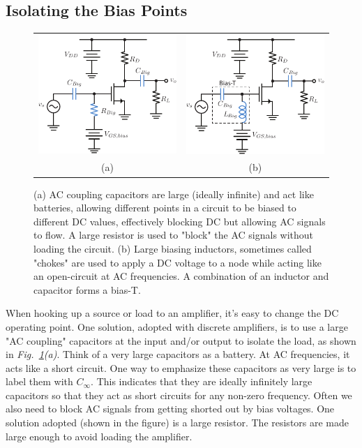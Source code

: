 \subsection{Isolating the Bias Points}
\begin{figure}[tb]
\centering
\begin{tabular}{cc}
\includegraphics[width=.4\columnwidth]{csamp_bias} &
\includegraphics[width=.4\columnwidth]{csamp_biasT}\\
(a) & (b)\\
\end{tabular}
\caption{(a) AC coupling capacitors are large (ideally infinite) and act like batteries, allowing different points in a circuit to be biased to different DC values, effectively blocking DC but allowing AC signals to flow.  A large resistor is used to "block" the AC signals without loading the circuit.  (b) Large biasing inductors, sometimes called "chokes" are used to apply a DC voltage to a node while acting like an open-circuit at AC frequencies.  A combination of an inductor and capacitor forms a bias-T.}
\label{fig:ac_couple}
\end{figure}
When hooking up a source or load to an amplifier, it's easy to change the DC operating point.  One solution, adopted with discrete amplifiers, is to use a large "AC coupling" capacitors at the input and/or output to isolate the load, as shown in \emph{Fig.~\ref{fig:ac_couple}(a)}. Think of a very large capacitors as a battery. At AC frequencies, it acts like a short circuit.  One way to emphasize these capacitors as very large is to label them with $C_\infty$. This indicates that they are ideally infinitely large capacitors so that they act as short circuits for any non-zero frequency.  Often we also need to block AC signals from getting shorted out by bias voltages.  One solution adopted (shown in the figure) is a large resistor.  The resistors are made large enough to avoid loading the amplifier.
